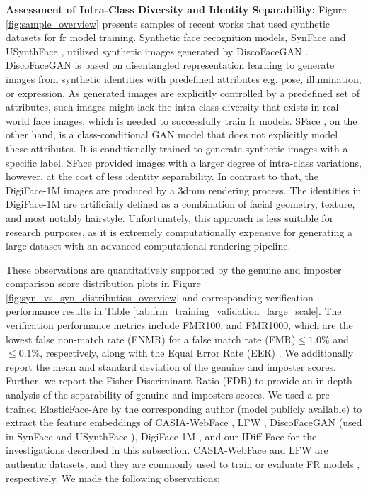 \documentclass[10pt,twocolumn,letterpaper]{article}
\newcommand{\approachname}{IDiff-Face }
\begin{document}
\textbf{Assessment of Intra-Class Diversity and Identity Separability:} Figure \ref{fig:sample_overview} presents samples of recent works that used synthetic datasets for \acrshort{fr} model training.
Synthetic face recognition models, SynFace \cite{Qiu2021} and USynthFace \cite{FBoutros2022USynthFace}, utilized synthetic images generated by DiscoFaceGAN \cite{Deng2020}. DiscoFaceGAN is based on disentangled representation learning to generate images from synthetic identities with predefined attributes e.g. pose, illumination, or expression. 
As generated images are explicitly controlled by a predefined set of attributes, such images might lack the intra-class diversity that exists in real-world face images, which is needed to successfully train \acrshort{fr} models. 
SFace \cite{Boutros2022SFace}, on the other hand, is a class-conditional GAN model that does not explicitly model these attributes. It is conditionally trained to generate synthetic images with a specific label. SFace provided images with a larger degree of intra-class variations, however, at the cost of less identity separability. 
In contrast to that, the DigiFace-1M \cite{DigiFace1M} images are produced by a \acrshort{3dmm} rendering process. The identities in DigiFace-1M are artificially defined as a combination of facial geometry, texture, and most notably hairstyle. Unfortunately, this approach is less suitable for research purposes, as it is extremely computationally expensive for generating a large dataset with an advanced computational rendering pipeline. 


These observations are quantitatively supported by the genuine and imposter comparison score distribution plots in Figure \ref{fig:syn_vs_syn_distributios_overview} and corresponding verification performance results in Table \ref{tab:frm_training_validation_large_scale}.
The verification performance metrics include FMR100, and FMR1000, which are the lowest false non-match rate (FNMR) for a false match rate (FMR)$\leq1.0\%$ and $\leq0.1\%$, respectively, along with the Equal Error Rate (EER) \cite{iso_metric}. We additionally report the mean and standard deviation of the genuine and imposter scores. Further, we report the Fisher Discriminant Ratio (FDR) \cite{poh2004study} to provide an in-depth analysis of the separability of genuine and imposters scores. We used a pre-trained ElasticFace-Arc \cite{ElasticFace} by the corresponding author (model publicly available) to extract the feature embeddings of CASIA-WebFace \cite{Yi2014}, LFW \cite{LFWDatabase}, DiscoFaceGAN \cite{Deng2020} (used in SynFace \cite{Qiu2021} and USynthFace \cite{FBoutros2022USynthFace}), DigiFace-1M \cite{DigiFace1M}, and our \approachname for the investigations described in this subsection. CASIA-WebFace \cite{Yi2014} and LFW \cite{LFWDatabase} are authentic datasets, and they are commonly used to train or evaluate FR models \cite{ArcFace,ElasticFace}, respectively. We made the following observations:
\end{document}
